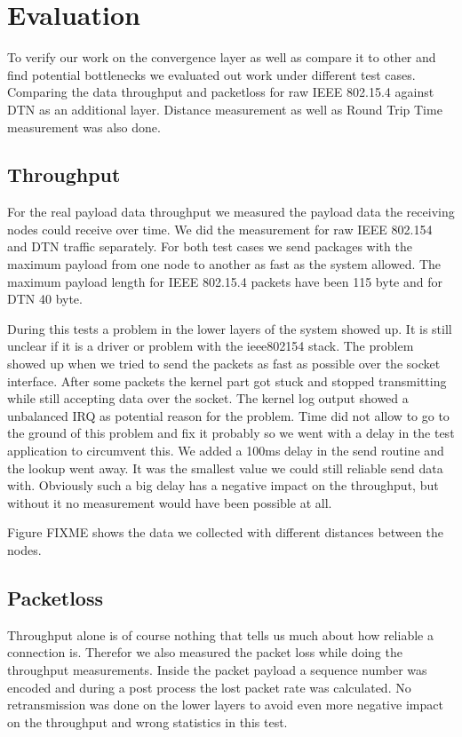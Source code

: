 \chapter{Evaluation}
To verify our work on the convergence layer as well as compare it to other and
find potential bottlenecks we evaluated out work under different test cases.
Comparing the data throughput and packetloss for raw IEEE 802.15.4 against DTN
as an additional layer. Distance measurement as well as Round Trip Time
measurement was also done.

\section{Throughput}
For the real payload data throughput we measured the payload data the receiving
nodes could receive over time. We did the measurement for raw IEEE 802.154 and
DTN traffic separately. For both test cases we send packages with the maximum
payload from one node to another as fast as the system allowed. The maximum
payload length for IEEE 802.15.4 packets have been 115 byte and for DTN 40 byte.

During this tests a problem in the lower layers of the system showed up. It is
still unclear if it is a driver or problem with the ieee802154 stack. The
problem showed up when we tried to send the packets as fast as possible over the
socket interface. After some packets the kernel part got stuck and stopped
transmitting while still accepting data over the socket. The kernel log output
showed a unbalanced IRQ as potential reason for the problem. Time did not allow
to go to the ground of this problem and fix it probably so we went with a delay
in the test application to circumvent this. We added a 100ms delay in the send
routine and the lookup went away. It was the smallest value we could still
reliable send data with. Obviously such a big delay has a negative impact on the
throughput, but without it no measurement would have been possible at all.

Figure FIXME shows the data we collected with different distances between the
nodes.

\section{Packetloss}
Throughput alone is of course nothing that tells us much about how reliable a
connection is. Therefor we also measured the packet loss while doing the
throughput measurements. Inside the packet payload a sequence number was encoded
and during a post process the lost packet rate was calculated. No retransmission
was done on the lower layers to avoid even more negative impact on the
throughput and wrong statistics in this test.

